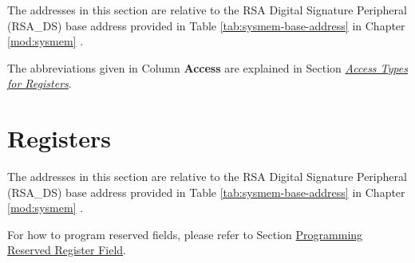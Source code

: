 \documentclass[main\_\_EN.tex]{subfiles}
\begin{document}
The addresses in this section are relative to the RSA Digital Signature Peripheral (RSA\_DS) base address provided in Table \ref{tab:sysmem-base-address} in Chapter \ref{mod:sysmem} \textit{}.

The abbreviations given in Column \textbf{Access} are explained in Section \hyperref[glossary-access-types]{\textit{Access Types for Registers}}.






\newpage
\section{Registers}

The addresses in this section are relative to the RSA Digital Signature Peripheral (RSA\_DS) base address provided in Table \ref{tab:sysmem-base-address} in Chapter \ref{mod:sysmem} \textit{}.

For how to program reserved fields, please refer to Section \hyperref[programming-reserved-field]{Programming Reserved Register Field}.


\end{document}
